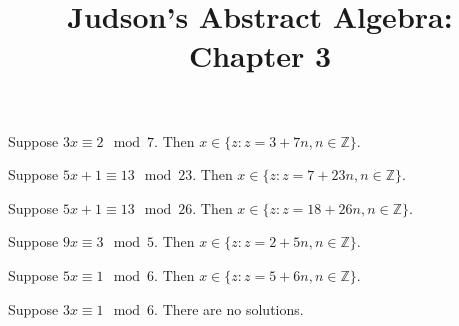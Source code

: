 \documentclass[a4paper]{article}
\title{Judson's Abstract Algebra: Chapter 3}
\date{}
\begin{document}
\maketitle

\section{}

Suppose $3x \equiv 2 \mod 7$. Then $x \in \{z: z = 3 + 7n, n \in \mathbb{Z}\}$.

\vspace{\baselineskip}

Suppose $5x + 1 \equiv 13 \mod 23$. Then $x \in \{z: z = 7 + 23n, n \in \mathbb{Z}\}$.

\vspace{\baselineskip}

Suppose $5x + 1 \equiv 13 \mod 26$. Then $x \in \{z: z = 18 + 26n, n \in \mathbb{Z}\}$.

\vspace{\baselineskip}

Suppose $9x \equiv 3 \mod 5$. Then $x \in \{z: z = 2 + 5n, n \in \mathbb{Z}\}$.

\vspace{\baselineskip}

Suppose $5x \equiv 1 \mod 6$. Then $x \in \{z: z = 5 + 6n, n \in \mathbb{Z}\}$.

\vspace{\baselineskip}

Suppose $3x \equiv 1 \mod 6$. There are no solutions.

\section{}

\section{}

\section{}

\section{}

\section{}
\end{document}
